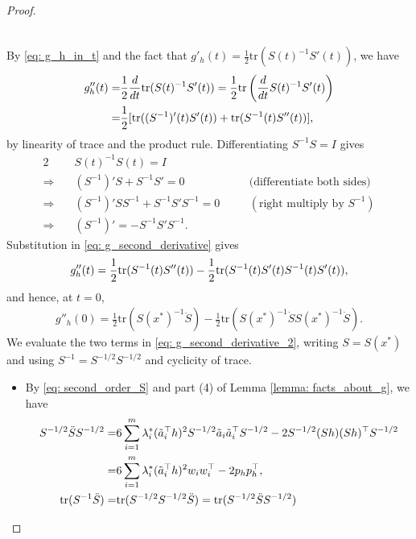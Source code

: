 \documentclass[10pt,a4paper]{amsart}
\newcommand{\tr}{\mathrm{tr}}
\begin{document}
\begin{proof}
\begin{itemize}
\begin{align}
        \end{align}
    \end{itemize}
    By \eqref{eq: g_h_in_t} and the fact that $g'_h(t) = \frac{1}{2}\tr(S(t)^{-1}S'(t))$, we have
    \begin{align}
     g_h''(t) = & \frac{1}{2}\frac{d}{dt}\tr(S(t)^{-1}S'(t)) = \frac{1}{2} \tr\left(\frac{d}{dt} S(t)^{-1}S'(t)\right) \notag \\
        = & \frac{1}{2} [\tr((S^{-1})'(t)S'(t)) +  \tr(S^{-1}(t)S''(t))], \label{eq: g_second_derivative}
    \end{align}
    by linearity of trace and the product rule. Differentiating $S^{-1}S=I$ gives
    \begin{alignat*}{2}
        & S(t)^{-1} S(t) = I \quad &&   \\
        \Rightarrow\quad  & (S^{-1})'S + S^{-1}S' = 0 \quad && \text{(differentiate both sides)}\\
        \Rightarrow \quad & (S^{-1})'S S^{-1}+ S^{-1}S'S^{-1}  = 0 \quad && (\text{right multiply by $S^{-1}$}) \\
        \Rightarrow \quad & (S^{-1})' = -S^{-1}S'S^{-1}.
    \end{alignat*}
    Substitution in \eqref{eq: g_second_derivative} gives
    \begin{align}
        g''_h(t)
        = \frac{1}{2}\tr(S^{-1}(t)S''(t)) - \frac{1}{2}\tr(S^{-1}(t)S'(t)S^{-1}(t)S'(t)),\notag
    \end{align}
    and hence, at $t=0$,
    \begin{align}\label{eq: g_second_derivative_2}
        g''_h(0) = \frac{1}2\tr(S(x^*)^{-1} \ddot{S}) - \frac{1}{2}\tr(S(x^*)^{-1}\dot{S}S(x^*)^{-1}\dot{S}).
    \end{align}
    We evaluate the two terms in \eqref{eq: g_second_derivative_2}, writing
    $S=S(x^*)$ and using $S^{-1}=S^{-1/2}S^{-1/2}$ and cyclicity of trace.
    \begin{itemize}
        \item By \eqref{eq: second_order_S} and part (4) of Lemma \ref{lemma: facts_about_g}, we have
        \begin{align}
            S^{-1/2}\ddot{S} S^{-1/2} =& 6 \sum_{i=1}^m \lambda^*_i (\tilde{a}_i^\top h)^2 S^{-1/2} \tilde{a}_i\tilde{a}_i^\top S^{-1/2} - 2S^{-1/2}(Sh)(Sh)^\top S^{-1/2} \notag \\
            = &  6 \sum_{i=1}^m \lambda^*_i (\tilde{a}_i^\top h)^2 w_iw_i^\top - 2p_hp_h^\top  \notag, \\
            \tr(S^{-1}\ddot{S}) = & \tr(S^{-1/2}S^{-1/2}\ddot{S} ) = \tr(S^{-1/2}\ddot{S} S^{-1/2}) \notag \\

\end{align}
\end{itemize}
\end{proof}
\end{document}
